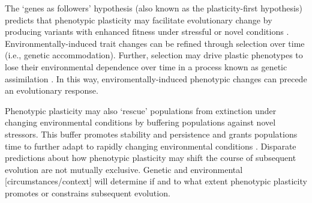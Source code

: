 The `genes as followers' hypothesis (also known as the plasticity-first hypothesis) predicts that phenotypic plasticity may facilitate evolutionary change by producing variants with enhanced fitness under stressful or novel conditions \citep{west-eberhard_developmental_2003,schwander_genes_2011,levis_evaluating_2016}. 
Environmentally-induced trait changes can be refined through selection over time (i.e., genetic accommodation).
Further, selection may drive plastic phenotypes to lose their environmental dependence over time in a process known as genetic assimilation \citep{west-eberhard_developmental_2005,pigliucci_phenotypic_2006,crispo_baldwin_2007,schlichting_phenotypic_2014,levis_evaluating_2016}. 
In this way, enviromentally-induced phenotypic changes can precede an evolutionary response.

Phenotypic plasticity may also `rescue' populations from extinction under changing environmental conditions by buffering populations against novel stressors.
This buffer promotes stability and persistence and grants populations time to further adapt to rapidly changing environmental conditions \citep{west-eberhard_developmental_2003,chevin_when_2010}. %
Disparate predictions about how phenotypic plasticity may shift the course of subsequent evolution are not mutually exclusive.
Genetic and environmental [circumstances/context] will determine if and to what extent phenotypic plasticity promotes or constrains subsequent evolution.


